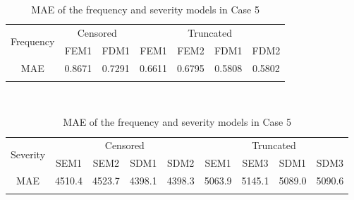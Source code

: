\begin{table}[!h]
\renewcommand{\tabcolsep}{0.8mm}
\renewcommand{\arraystretch}{1}
\footnotesize
\centering
{\color{blue}
\begin{tabular}[h]{ccccccc}
\toprule
\multirow{2}{*}{Frequency} & \multicolumn{2}{c}{Censored} & \multicolumn{4}{c}{Truncated}\\
\cmidrule(l{3pt}r{3pt}){2-3} \cmidrule(l{3pt}r{3pt}){4-7}
 & FEM1 & FDM1 & FEM1 & FEM2 & FDM1 & FDM2\\
\midrule
MAE & 0.8671 & 0.7291 & 0.6611 & 0.6795 & 0.5808 & 0.5802 \\
\hhline{=======}
\end{tabular}
\\
\vspace{0.3cm}
\begin{tabular}[h]{ccccccccc}
\toprule
\multirow{2}{*}{Severity} & \multicolumn{4}{c}{Censored} & \multicolumn{4}{c}{Truncated}\\
\cmidrule(l{3pt}r{3pt}){2-5} \cmidrule(l{3pt}r{3pt}){6-9}
 & SEM1 & SEM2 & SDM1 & SDM2 & SEM1 & SEM3 & SDM1 & SDM3\\
\midrule
MAE & 4510.4 & 4523.7 & 4398.1 & 4398.3 & 5063.9 & 5145.1 & 5089.0 & 5090.6 \\
\hhline{=========}
\end{tabular}
}
\caption{MAE of the frequency and severity models in Case 5}\label{tab:maecase5}
\end{table}
